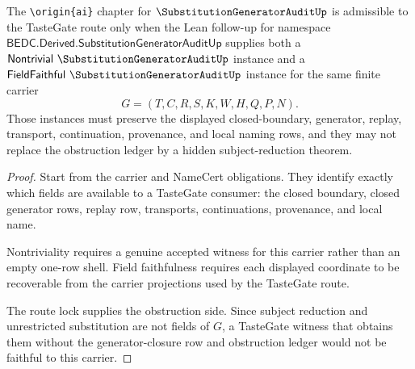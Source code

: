\begin{theorem}
\label{thm:substitution-generator-audit-tastegate-obligation}
The \texttt{\textbackslash origin\{ai\}} chapter for $\SubstitutionGeneratorAuditUp$ is admissible to the TasteGate route only when the Lean follow-up for namespace $\mathsf{BEDC.Derived.SubstitutionGeneratorAuditUp}$ supplies both a $\mathsf{Nontrivial}\ \SubstitutionGeneratorAuditUp$ instance and a $\mathsf{FieldFaithful}\ \SubstitutionGeneratorAuditUp$ instance for the same finite carrier
$$
G=(T,C,R,S,K,W,H,Q,P,N).
$$
Those instances must preserve the displayed closed-boundary, generator, replay, transport, continuation, provenance, and local naming rows, and they may not replace the obstruction ledger by a hidden subject-reduction theorem.
\end{theorem}
\begin{proof}
Start from the carrier and NameCert obligations. They identify exactly which fields are available to a TasteGate consumer: the closed boundary, closed generator rows, replay row, transports, continuations, provenance, and local name.

Nontriviality requires a genuine accepted witness for this carrier rather than an empty one-row shell. Field faithfulness requires each displayed coordinate to be recoverable from the carrier projections used by the TasteGate route.

The route lock supplies the obstruction side. Since subject reduction and unrestricted substitution are not fields of $G$, a TasteGate witness that obtains them without the generator-closure row and obstruction ledger would not be faithful to this carrier.
\end{proof}



